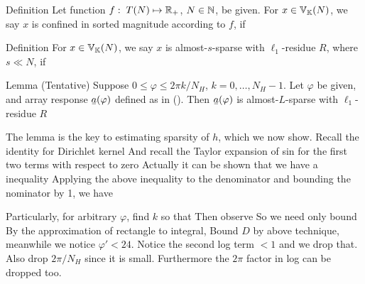 \Result
{Definition}
{
Let function \(f:\; T (N) \mapsto \mathbb{R}_+\), \(N \in \mathbb{N}\), be given.
For \(x \in \mathbb{V}_{\mathbb{K}}(N)\), we say \(x\) is confined in sorted magnitude according to \(f\), if
}

\Result
{Definition}
{
For \(x \in \mathbb{V}_{\mathbb{K}}(N)\), we say \(x\) is almost-\(s\)-sparse with \(\ell_1\)-residue \(R\), where \(s \ll N\), if
}


\Result
{Lemma (Tentative)}
{
Suppose \(0 \leq \varphi \leq 2\pi k /N_H\), \(k =0, \dotsc, N_H-1\).
Let \(\varphi\) be given, and array response \(\V{a} (\varphi)\) defined as in ().
Then \(\V{a} (\varphi)\) is almost-\(L\)-sparse with \(\ell_1\)-residue \(R\)
%
}

The lemma is the key to estimating sparsity of \(h\), which we now show.
Recall the identity for Dirichlet kernel
%
%
And recall the Taylor expansion of sin for the first two terms with respect to zero
%
%
Actually it can be shown that we have a inequality
%
%
Applying the above inequality to the denominator and bounding the nominator by 1, we have
%

Particularly, for arbitrary \(\varphi\), find \(k\) so that
%
Then observe
So we need only bound
By the approximation of rectangle to integral,
Bound \(D\) by above technique, meanwhile we notice \(\varphi' <24\).
Notice the second log term \(<1\) and we drop that.
Also drop \(2\pi /N_H\) since it is small.
Furthermore the \(2\pi\) factor in log can be dropped too.

